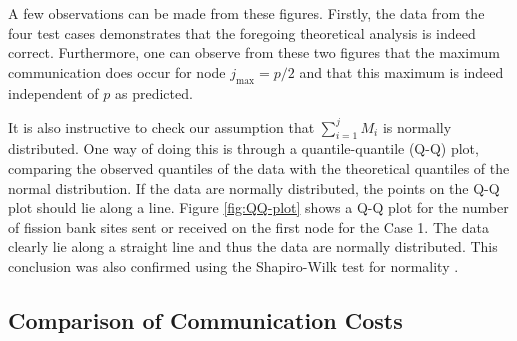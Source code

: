 \documentclass[11pt]{article}
\begin{document}
A few observations can be made from these figures. Firstly, the data
from the four test cases demonstrates that the foregoing theoretical
analysis is indeed correct. Furthermore, one can observe from these
two figures that the maximum communication does occur for node
$j_{\text{max}} = p/2$ and that this maximum is indeed independent of
$p$ as predicted.

It is also instructive to check our assumption that $\sum_{i=1}^j M_i$
is normally distributed. One way of doing this is through a
quantile-quantile (Q-Q) plot, comparing the observed quantiles of the
data with the theoretical quantiles of the normal distribution. If the
data are normally distributed, the points on the Q-Q plot should lie
along a line. Figure \ref{fig:QQ-plot} shows a Q-Q plot for the number
of fission bank sites sent or received on the first node for the Case
1. The data clearly lie along a straight line and thus the data are
normally distributed. This conclusion was also confirmed using the
Shapiro-Wilk test for normality \cite{shapiro-wilk}.

\subsection{Comparison of Communication Costs}
\end{document}
